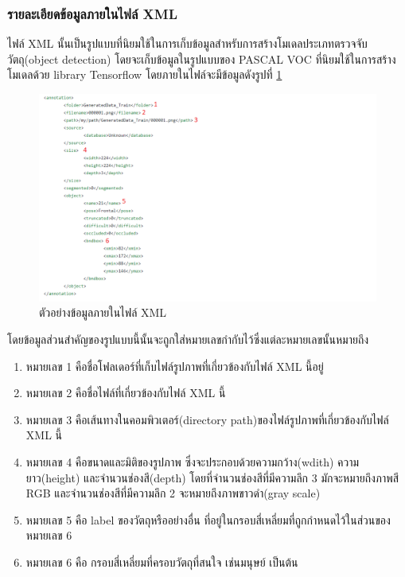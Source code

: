 \subsubsection{รายละเอียดข้อมูลภายในไฟล์ XML}
\label{sec:XMLInfo}
ไฟล์ XML นั้นเป็นรูปแบบที่นิยมใช้ในการเก็บข้อมูลสำหรับการสร้างโมเดลประเภทตรวจจับวัตถุ(object detection)
โดยจะเก็บข้อมูลในรูปแบบของ PASCAL VOC ที่นิยมใช้ในการสร้างโมเดลด้วย library Tensorflow โดยภายในไฟล์จะมีข้อมูลดังรูปที่ \ref{fig:XMLFormat}
\begin{figure}[!ht]
    \centering
    \includegraphics[width=1\textwidth]{chapter3/images/3_6/XMLFormat.png}
    \caption{ตัวอย่างข้อมูลภายในไฟล์ XML}
    \label{fig:XMLFormat}
\end{figure}
โดยข้อมูลส่วนสำคัญของรูปแบบนี้นั้นจะถูกใส่หมายเลขกำกับไว้ซึ่งแต่ละหมายเลขนั้นหมายถึง
\begin{enumerate}
	\setlength\itemsep{-0.25em}
    \item หมายเลข 1 คือชื่อโฟลเดอร์ที่เก็บไฟล์รูปภาพที่เกี่ยวข้องกับไฟล์ XML นี้อยู่
    \item หมายเลข 2 คือชื่อไฟล์ที่เกี่ยวข้องกับไฟล์ XML นี้
    \item หมายเลข 3 คือเส้นทางในคอมพิวเตอร์(directory path)ของไฟล์รูปภาพที่เกี่ยวข้องกับไฟล์ XML นี้
    \item หมายเลข 4 คือขนาดและมิติของรูปภาพ ซึ่งจะประกอบด้วยความกว้าง(wdith) ความยาว(height) และจำนวนช่องสี(depth) 
    โดยที่จำนวนช่องสีที่มีความลึก 3 มักจะหมายถึงภาพสี RGB และจำนวนช่องสีที่มีความลึก 2 จะหมายถึงภาพขาวดำ(gray scale)
	\item หมายเลข 5 คือ label ของวัตถุหรืออย่างอื่น ที่อยู่ในกรอบสี่เหลี่ยมที่ถูกกำหนดไว้ในส่วนของหมายเลข 6
	\item หมายเลข 6 คือ กรอบสี่เหลี่ยมที่ครอบวัตถุที่สนใจ เช่นมนุษย์ เป็นต้น
\end{enumerate}